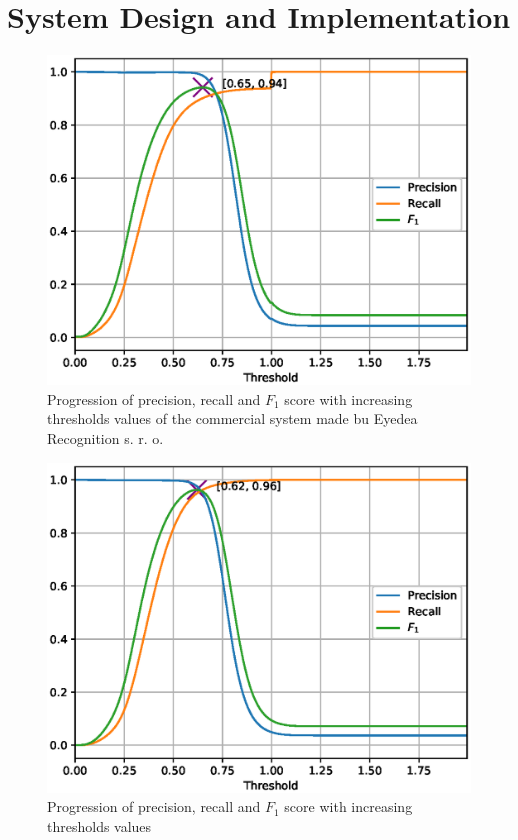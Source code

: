 \chapter{System Design and Implementation}\label{ch:implementation}

\begin{figure}[H]
    \centering
    \includegraphics{images/implementation/prft_eyedea.eps}
    \caption{Progression of precision, recall and $F_1$ score with increasing thresholds values of the commercial
    system made bu Eyedea Recognition s. r. o.}
    \label{fig:prft_eyedea}
\end{figure}

\begin{figure}[H]
    \centering
    \includegraphics{images/implementation/prft_fav-128_N1.eps}
    \caption{{Progression of precision, recall and $F_1$ score with increasing thresholds values}}
    \label{fig:prft}
\end{figure}